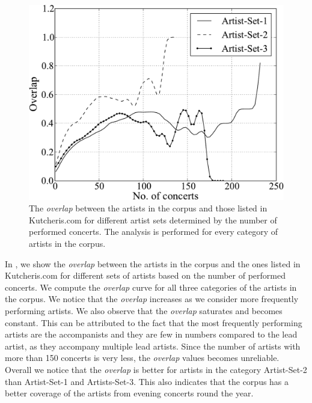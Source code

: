 \begin{figure}
	\begin{center}
		\includegraphics[width=\figSizeSixtyFive]{ch04_datasets/figures/artist-coverage-vs-performances.pdf}
	\end{center}
	\caption[Overlap between the artists in the Carnatic music corpus and Kutcheris.com]{The \textit{overlap} between the artists in the corpus and those listed in Kutcheris.com for different artist sets determined by the number of performed concerts. The analysis is performed for every category of artists in the corpus.}
	\label{fig:artist_coverage_vs_number_of_concerts}
\end{figure}

In , we show the \textit{overlap} between the artists in the corpus and the ones listed in Kutcheris.com for different sets of artists based on the number of performed concerts. We compute the \textit{overlap} curve for all three categories of the artists in the corpus. We notice that the \textit{overlap} increases as we consider more frequently performing artists. We also observe that the \textit{overlap} saturates and becomes constant. This can be attributed to the fact that the most frequently performing artists are the accompanists and they are few in numbers compared to the lead artist, as they accompany multiple lead artists. Since the number of artists with more than 150 concerts is very less, the \textit{overlap}
values becomes unreliable. Overall we notice that the \textit{overlap} is better for artists in the category Artist-Set-2 than Artist-Set-1 and Artists-Set-3. This also indicates that the corpus has a better coverage of the artists from evening concerts round the year.


